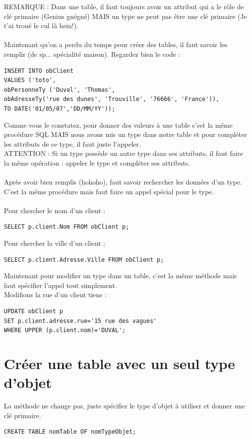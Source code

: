 \documentclass{report}
\begin{document}
REMARQUE : Dans une table, il faut toujours avoir un attribut qui a le rôle de clé primaire (Genius gnégné) MAIS un type ne peut pas être une clé primaire (Je t'ai troué le cul là hein!).\\ \\
Maintenant qu'on a perdu du temps pour créer des tables, il faut savoir les remplir (de sp... spécialité maison). Regardez bien le code :
\begin{lstlisting}[style=MySQLStyle]
INSERT INTO obClient
VALUES ('toto',
obPersonneTy ('Duval', 'Thomas',
obAdresseTy('rue des dunes', 'Trouville', '76666', 'France')),
TO DATE('01/05/07','DD/MM/YY'));
\end{lstlisting}
Comme vous le constatez, pour donner des valeurs à une table c'est la même procédure SQL MAIS nous avons mis un type dans notre table et pour compléter les attributs de ce type, il faut juste l'appeler.\\
ATTENTION : Si un type possède un autre type dans ses attributs, il faut faire la même opération : appeler le type et compléter ses attributs. \\\\

Après avoir bien remplis (hohoho), faut savoir rechercher les données d'un type. C'est la même procédure mais faut faire un appel spécial pour le type.\\ \\
Pour chercher le nom d'un client :
\begin{lstlisting}[style=MySQLStyle]
SELECT p.client.Nom FROM obClient p;
\end{lstlisting}

Pour chercher la ville d'un client ;
\begin{lstlisting}[style=MySQLStyle]
SELECT p.client.Adresse.Ville FROM obClient p;
\end{lstlisting}

Maintenant pour modifier un type dans un table, c'est la même méthode mais faut spécifier l'appel tout simplement.\\
Modifions la rue d'un client tiens :
\begin{lstlisting}[style=MySQLStyle]
UPDATE obClient p
SET p.client.adresse.rue='15 rue des vagues'
WHERE UPPER (p.client.nom)='DUVAL';
\end{lstlisting}

\section{Créer une table avec un seul type d'objet}
La méthode ne change pas, juste spécifier le type d'objet à utiliser et donner une clé primaire.
\begin{lstlisting}[style=MySQLStyle]
CREATE TABLE nomTable OF nomTypeObjet;
\end{lstlisting}
\end{document}
